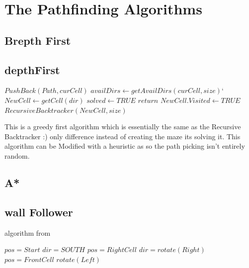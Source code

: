 \documentclass[conference]{IEEEtran}
\begin{document}
\section{The Pathfinding Algorithms}

\subsection{Brepth First}

\subsection{depthFirst}
\begin{algorithm}
    \caption{depthFirst}\label{alg:dp}
    \begin{algorithmic}[1]
    \State $PushBack(Path, curCell)$
    \State $availDirs \gets getAvailDirs(curCell, size)$`
        \State $NewCell \gets getCell(dir)$
    \State $solved \gets TRUE$
    \State $return$
    \EndIf
        \State $NewCell.Visited \gets TRUE$
        \State $RecursiveBacktracker(NewCell, size)$
    \EndIf
    \EndFor
    \EndProcedure
        
    \end{algorithmic}
\end{algorithm}


This is a greedy first algorithm which is essentially the same as the Recursive Backtracker :) only difference instead of creating the maze its solving it. This algorithm can be Modified with a heuristic as so the path picking isn't entirely random.

\subsection{A*}

\subsection{wall Follower}

algorithm from \cite{narendranMazeSolverExploringAlgorithmic2024}
\begin{algorithm}
    \caption{}\label{alg:wf}
    \begin{algorithmic}[1]
        \State $pos = Start$
        \State $dir = SOUTH$
                \State $pos = RightCell$
                \State $dir = rotate(Right)$
                \State $pos = FrontCell$
            \Else
                \State $rotate(Left)$
            \EndIf
        \EndWhile
        \EndProcedure
    \end{algorithmic}
\end{algorithm}
\end{document}
